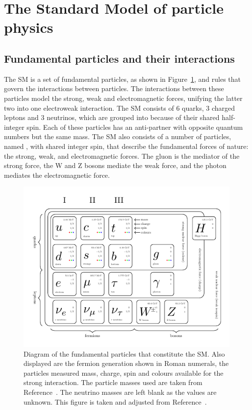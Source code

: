 \section{The Standard Model of particle physics}

\subsection{Fundamental particles and their interactions}

The \ac{SM} is a set of fundamental particles, as shown in Figure~\ref{fig:sm_diagram}, and rules that govern the interactions between particles.
The interactions between these particles model the strong, weak and electromagnetic forces, unifying the latter two into one electroweak interaction.
The \ac{SM} consists of 6 quarks, 3 charged leptons and 3 neutrinos, which are grouped into  because of their shared half-integer spin. 
Each of these particles has an anti-partner with opposite quantum numbers but the same mass.
The \ac{SM} also consists of a number of particles, named , with shared integer spin, that describe the fundamental forces of nature: the strong, weak, and electromagnetic forces. 
The gluon is the mediator of the strong force, the W and Z bosons mediate the weak force, and the photon mediates the electromagnetic force. \\

\begin{figure}[!hbtp]
\centering
    \includegraphics[width=0.99\textwidth]{Figures/SM_diagram.pdf}
\caption[Diagram of the fundamental particles in the SM.]{Diagram of the fundamental particles that constitute the SM. Also displayed are the fermion generation shown in Roman numerals, the particles measured mass, charge, spin and colours available for the strong interaction. The particle masses used are taken from Reference~\cite{ParticleDataGroup:2022pth}. The neutrino masses are left blank as the values are unknown. This figure is taken and adjusted from Reference~\cite{sm_diagram}.}
\label{fig:sm_diagram}
\end{figure}

